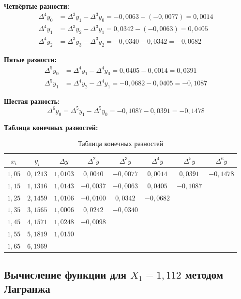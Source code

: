 \textbf{Четвёртые разности:}
\begin{align*}
\Delta^4 y_0 &= \Delta^3 y_1 - \Delta^3 y_0 = -0{,}0063 - (-0{,}0077) = 0{,}0014 \\
\Delta^4 y_1 &= \Delta^3 y_2 - \Delta^3 y_1 = 0{,}0342 - (-0{,}0063) = 0{,}0405 \\
\Delta^4 y_2 &= \Delta^3 y_3 - \Delta^3 y_2 = -0{,}0340 - 0{,}0342 = -0{,}0682
\end{align*}

\textbf{Пятые разности:}
\begin{align*}
\Delta^5 y_0 &= \Delta^4 y_1 - \Delta^4 y_0 = 0{,}0405 - 0{,}0014 = 0{,}0391 \\
\Delta^5 y_1 &= \Delta^4 y_2 - \Delta^4 y_1 = -0{,}0682 - 0{,}0405 = -0{,}1087
\end{align*}

\textbf{Шестая разность:}
\[
\Delta^6 y_0 = \Delta^5 y_1 - \Delta^5 y_0 = -0{,}1087 - 0{,}0391 = -0{,}1478
\]

\textbf{Таблица конечных разностей:}

\begin{table}[h!]
\centering
\label{tab:diff}
\renewcommand{\arraystretch}{1.5}
\begin{tabular}{|c|c|c|c|c|c|c|c|}
\hline
$x_i$ & $y_i$ & $\Delta y$ & $\Delta^2 y$ & $\Delta^3 y$ & $\Delta^4 y$ & $\Delta^5 y$ & $\Delta^6 y$ \\
\hline
$1{,}05$ & $0{,}1213$ & $1{,}0103$ & $0{,}0040$ & $-0{,}0077$ & $0{,}0014$ & $0{,}0391$ & $-0{,}1478$ \\
$1{,}15$ & $1{,}1316$ & $1{,}0143$ & $-0{,}0037$ & $-0{,}0063$ & $0{,}0405$ & $-0{,}1087$ & \\
$1{,}25$ & $2{,}1459$ & $1{,}0106$ & $-0{,}0100$ & $0{,}0342$ & $-0{,}0682$ & & \\
$1{,}35$ & $3{,}1565$ & $1{,}0006$ & $0{,}0242$ & $-0{,}0340$ & & & \\
$1{,}45$ & $4{,}1571$ & $1{,}0248$ & $-0{,}0098$ & & & & \\
$1{,}55$ & $5{,}1819$ & $1{,}0150$ & & & & & \\
$1{,}65$ & $6{,}1969$ & & & & & & \\
\hline
\end{tabular}
\caption{Таблица конечных разностей}
\end{table}

\newpage
\subsection{Вычисление функции для $X_1 = 1{,}112$ методом Лагранжа}

